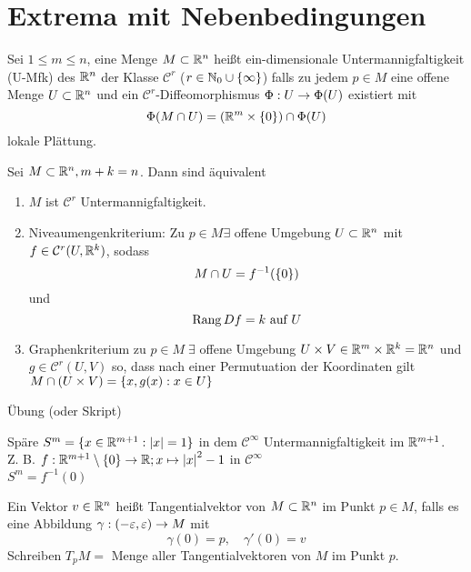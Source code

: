 \documentclass[../ana2.tex]{subfiles}
\begin{document}
\setcounter{section}{17}
\section{Extrema mit Nebenbedingungen}
\begin{defi}
    Sei \( 1 \leq m \leq n \), eine Menge \( M \subset \mathbb{R}^n \) 
    heißt ein-dimensionale Untermannigfaltigkeit 
    (U-Mfk) des \( \mathbb{R}^n \) der Klasse \( \mathcal{C}^r \) 
    (\(r \in \mathbb{N}_0 \cup \{\infty\} \)) falls zu jedem 
    \( p \in M \) eine offene Menge \( U \subset \mathbb{R}^n \) 
    und ein \( \mathcal{C}^r \)-Diffeomorphismus
    \(\Phi:U\rightarrow \Phi(U)\) existiert mit 
    \[ \Phi(M \cap U) = (\mathbb{R}^m \times \{0\}) \cap \Phi(U)\]
    lokale Plättung.
\end{defi}
\begin{satz}[Untermannigfaltigkeitskriterium]
    Sei \( M \subset \mathbb{R}^n, m + k = n \). Dann sind äquivalent
    \begin{enumerate}
        \item \(M\) ist \(\mathcal{C}^r \) Untermannigfaltigkeit.        
        \item Niveaumengenkriterium: Zu \( p \in M \exists \) offene 
        Umgebung \( U \subset \mathbb{R}^n \) mit 
        \( f \in \mathcal{C}^r(U, \mathbb{R}^k) \), sodass
        \[ M \cap U = f^{-1}(\{0\}) \]
        und
        \[ \operatorname{Rang} Df = k \text{ auf } U \]
        \item Graphenkriterium zu \(p \in M \; \exists \) offene
        Umgebung \(U \times V \in \mathbb{R}^m \times \mathbb{R}^k = \mathbb{R}^n\) und
        \(g \in \mathcal{C}^r (U, V)\) so, dass
        nach einer Permutuation der Koordinaten gilt \(M \cap (U \times V) 
        = \{x,g(x) : x \in U\}\)
    \end{enumerate}
\end{satz}
\begin{bew}
    Übung (oder Skript)
\end{bew}
\begin{bsp}
    Späre \(S^m = \{x \in \mathbb{R}^{m+1}: \left|x\right| = 1\}\) in dem
    \(\mathcal{C}^\infty\) Untermannigfaltigkeit im \(\mathbb{R}^{m+1}\).\\
    Z. B. \(f:\mathbb{R}^{m+1} \setminus \{0\}\rightarrow \mathbb{R}; x \mapsto \left|x\right|^2 - 1 \) 
    in \(\mathcal{C}^\infty\)\\
    \( S^m = f^{-1}(0) \)
\end{bsp}
\begin{defi}
    Ein Vektor \(v \in \mathbb{R}^n\) heißt Tangentialvektor von \(M \subset \mathbb{R}^n\)
    im Punkt \(p \in M\), falls
    es eine Abbildung \( \gamma:(-\varepsilon, \varepsilon)\rightarrow M \) mit 
    \[ \gamma(0) = p, \quad \gamma'(0) = v \]
    Schreiben 
    \( T_p M = \) Menge aller Tangentialvektoren von \(M\) im Punkt \(p\).
\end{defi}
\end{document}
